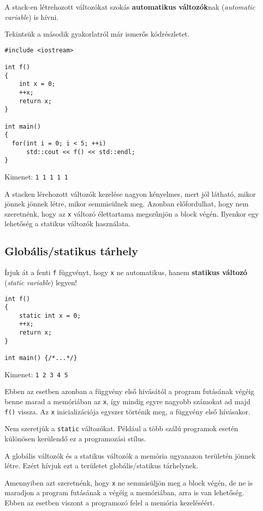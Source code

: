 \documentclass[a4paper,11.5pt,table]{article}
\begin{document}
	A stack-en létrehozott változókat szokás \textbf{automatikus változók}nak (\textit{automatic variable}) is hívni.
	
	\smallskip
	Tekintsük a második gyakorlatról már ismerős kódrészletet.
	
	\begin{lstlisting}
#include <iostream>

int f()
{
	int x = 0;
	++x;
	return x;
}

int main()
{
  for(int i = 0; i < 5; ++i)
	  std::cout << f() << std::endl;
}
	\end{lstlisting}
	Kimenet: \texttt{1 1 1 1 1}
	\smallskip
	
  A stacken lérehozott változók kezelése nagyon kényelmes, mert jól látható, mikor jönnek jönnek létre, mikor semmisülnek meg. Azonban előfordulhat, hogy nem szeretnénk, hogy az \texttt{x} változó élettartama megszűnjön a block végén. Ilyenkor egy lehetőség a statikus változók használata.
	\subsection{Globális/statikus tárhely}
	Írjuk át a fenti \texttt{f} függvényt, hogy \texttt{x} ne automatikus, hanem \textbf{statikus változó} (\textit{static variable}) legyen!
	\begin{lstlisting}
int f()
{
	static int x = 0;
	++x;
	return x;
}

int main() {/*...*/}
	\end{lstlisting}
	Kimenet: \texttt{1 2 3 4 5}
	
  Ebben az esetben azonban a függvény első hivásától a program futásának végéig benne marad a memóriában az \texttt{x}, így mindig egyre nagyobb számokat ad majd \texttt{f()} vissza. Az \texttt{x} inicializációja egyszer történik meg, a függvény első hívásakor. 
	\begin{note}
		Nem szeretjük a \texttt{static} változókat. Például a több szálú programok esetén különösen kerülendő ez a programozási stílus.
	\end{note}

  A globális változók és a statikus változók a memória ugyanazon területén jönnek létre. Ezért hívjuk ezt a területet globális/statikus tárhelynek.

  \medskip
	Amennyiben azt szeretnénk, hogy \texttt{x} ne semmisüljön meg a block végén, de ne is maradjon a program futásának a végéig a memóriában, arra is van lehetőség. Ebben az esetben viszont a programozó felel a memória kezeléséért.
\end{document}
